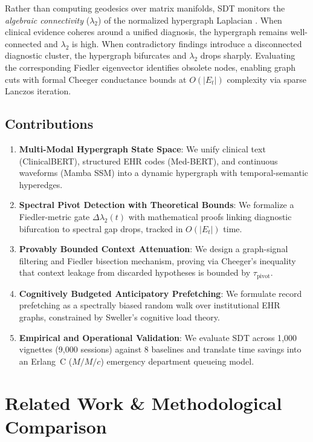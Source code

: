 \documentclass[10pt, onecolumn]{article}
\begin{document}
Rather than computing geodesics over matrix manifolds, SDT monitors the \emph{algebraic connectivity} ($\lambda_2$) of the normalized hypergraph Laplacian \cite{fiedler1973algebraic,chung1997spectral}. When clinical evidence coheres around a unified diagnosis, the hypergraph remains well-connected and $\lambda_2$ is high. When contradictory findings introduce a disconnected diagnostic cluster, the hypergraph bifurcates and $\lambda_2$ drops sharply. Evaluating the corresponding Fiedler eigenvector identifies obsolete nodes, enabling graph cuts with formal Cheeger conductance bounds at $O(|E_t|)$ complexity via sparse Lanczos iteration.

\subsection{Contributions}
\begin{enumerate}[(1)]
  \item \textbf{Multi-Modal Hypergraph State Space}: We unify clinical text (ClinicalBERT), structured EHR codes (Med-BERT), and continuous waveforms (Mamba SSM) into a dynamic hypergraph with temporal-semantic hyperedges.
  \item \textbf{Spectral Pivot Detection with Theoretical Bounds}: We formalize a Fiedler-metric gate $\Delta \lambda_2(t)$ with mathematical proofs linking diagnostic bifurcation to spectral gap drops, tracked in $O(|E_t|)$ time.
  \item \textbf{Provably Bounded Context Attenuation}: We design a graph-signal filtering and Fiedler bisection mechanism, proving via Cheeger's inequality that context leakage from discarded hypotheses is bounded by $\tau_{\text{pivot}}$.
  \item \textbf{Cognitively Budgeted Anticipatory Prefetching}: We formulate record prefetching as a spectrally biased random walk over institutional EHR graphs, constrained by Sweller's cognitive load theory.
  \item \textbf{Empirical and Operational Validation}: We evaluate SDT across 1{,}000 vignettes (9{,}000 sessions) against 8 baselines and translate time savings into an Erlang~C ($M/M/c$) emergency department queueing model.
\end{enumerate}

\section{Related Work \& Methodological Comparison}
\label{sec:related}
\end{document}
